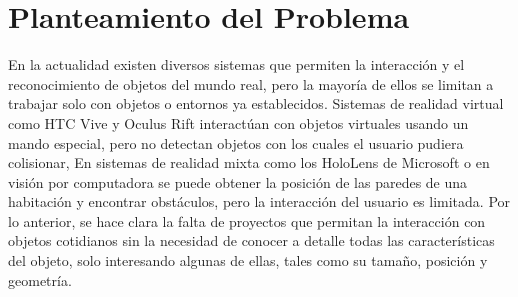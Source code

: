
\section{Planteamiento del Problema}

    En la actualidad existen diversos sistemas que permiten la interacción y el reconocimiento de objetos del mundo real, pero la mayoría de ellos se limitan a trabajar solo con objetos o entornos ya establecidos. Sistemas de realidad virtual como HTC Vive \cite{VIVEDis84:online} y Oculus Rift \cite{OculusRi96:online} interactúan con objetos virtuales usando un mando especial, pero no detectan objetos con los cuales el usuario pudiera colisionar, En sistemas de realidad mixta como los HoloLens de Microsoft \cite{HoloLens} o en visión por computadora se puede obtener la posición de las paredes de una habitación y encontrar obstáculos, pero la interacción del usuario es limitada. Por lo anterior, se hace clara la falta de proyectos que permitan la interacción con objetos cotidianos sin la necesidad de conocer a detalle todas las características del objeto, solo interesando algunas de ellas, tales como su tamaño, posición y geometría.
     
